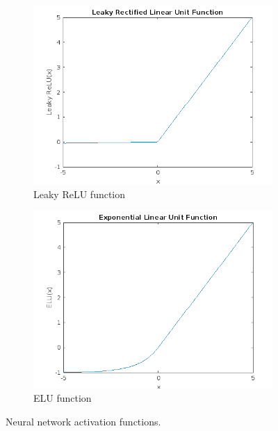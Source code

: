 \begin{figure}
\begin{subfigure}[b]{0.4\textwidth}
        \includegraphics[width=\textwidth]{figures/leakyrelu}
        \caption{Leaky ReLU function}
        \label{fig:leakyrelu}
    \end{subfigure}
    \hspace{0.1\textwidth}
    \begin{subfigure}[b]{0.4\textwidth}
        \includegraphics[width=\textwidth]{figures/elu}
        \caption{ELU function}
        \label{fig:elu}
    \end{subfigure}
    \caption{Neural network activation functions.}
    \label{fig:activationfunctions}
\end{figure}

